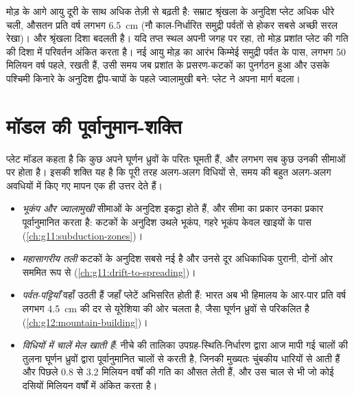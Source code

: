 मोड़ के आगे आयु दूरी के साथ अधिक तेज़ी से बढ़ती है: सम्राट
श्रृंखला के अनुदिश प्लेट अधिक धीरे चली, औसतन प्रति वर्ष लगभग \qty{6.5}{cm}
(नौ काल-निर्धारित समुद्री पर्वतों से होकर सबसे अच्छी सरल रेखा)। और श्रृंखला
दिशा बदलती है। यदि तप्त स्थल अपनी जगह पर रहा, तो मोड़ प्रशांत प्लेट की गति की
दिशा में परिवर्तन अंकित करता है। नई आयु
मोड़ का आरंभ किम्मेई समुद्री पर्वत के पास, लगभग 50 मिलियन वर्ष
पहले, रखती हैं, उसी समय जब प्रशांत के प्रसरण-कटकों का पुनर्गठन हुआ
और उसके पश्चिमी किनारे के अनुदिश द्वीप-चापों के पहले ज्वालामुखी बने:
प्लेट ने अपना मार्ग बदला।

\section{मॉडल की पूर्वानुमान-शक्ति}\label{sec:g11:plate-motions:predictive}

प्लेट मॉडल कहता है कि कुछ  अपने घूर्णन ध्रुवों के परितः घूमती हैं,
और लगभग सब कुछ उनकी सीमाओं पर होता है। इसकी शक्ति यह है कि
पूरी तरह अलग-अलग विधियों से, समय की बहुत अलग-अलग
अवधियों में किए गए मापन एक ही उत्तर देते हैं।

\begin{itemize}
  \item \emph{भूकंप और ज्वालामुखी} सीमाओं के अनुदिश इकट्ठा होते हैं, और
        सीमा का प्रकार उनका प्रकार पूर्वानुमानित करता है: कटकों के अनुदिश उथले भूकंप,
        गहरे भूकंप केवल खाइयों के पास (\cref{ch:g11:subduction-zones})।
  \item \emph{महासागरीय तली} कटकों के अनुदिश सबसे नई है और उनसे दूर अधिकाधिक
        पुरानी, दोनों ओर सममित रूप से
        (\cref{ch:g11:drift-to-spreading})।
  \item \emph{पर्वत-पट्टियाँ} वहाँ उठती हैं जहाँ प्लेटें अभिसरित होती हैं: भारत अब भी
        हिमालय के आर-पार प्रति वर्ष लगभग \qty{4.5}{cm} की दर से यूरेशिया की ओर चलता है,
        जैसा घूर्णन ध्रुवों से परिकलित है (\cref{ch:g12:mountain-building})।
  \item \emph{विधियों में चालें मेल खाती हैं}: नीचे की तालिका
        उपग्रह-स्थिति-निर्धारण द्वारा आज मापी गई चालों की तुलना
        घूर्णन ध्रुवों द्वारा पूर्वानुमानित चालों से करती है, जिनकी  मुख्यतः
        चुंबकीय धारियों से आती हैं और पिछले \num{0.8} से \num{3.2} मिलियन वर्षों की
        गति का औसत लेती हैं, और उस चाल से भी जो
        कोई  दसियों मिलियन वर्षों में अंकित करता है।
\end{itemize}

